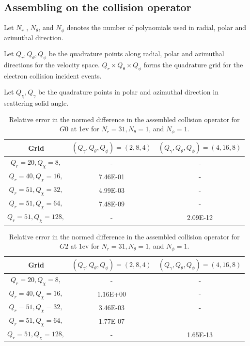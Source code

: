 \documentclass{article}
\begin{document}
\subsection{Assembling on the collision operator}
Let $N_r$ , $N_\theta$, and $N_\phi$ denotes the number of polynomials used in radial, polar and azimuthal direction. 

Let $Q_{r}, Q_{\theta}, Q_{\phi}$ be the quadrature points along radial, polar and azimuthal directions for the velocity space. $Q_{r} \times Q_{\theta} \times Q_{\phi}$ forms the quadrature grid for the electron collision incident events. 

Let $Q_{\chi},Q_{\gamma}$ be the quadrature points in polar and azimuthal direction in scattering solid angle. 

\begin{table}[H]
	\centering
	\begin{tabular}{|c|c|c|}
		\hline
		Grid & $(Q_\gamma,Q_\theta,Q_\phi)=(2,8,4)$ & $(Q_\gamma,Q_\theta,Q_\phi)=(4,16,8)$ \\
		\hline
		$Q_r=20,Q_\chi=8,$ & - & - \\
		$Q_r=40,Q_\chi=16,$ & 7.46E-01 & - \\
		$Q_r=51,Q_\chi=32,$ & 4.99E-03 & - \\
		$Q_r=51,Q_\chi=64,$ & 7.48E-09 & - \\
		$Q_r=51,Q_\chi=128,$ & - & 2.09E-12 \\
		\hline
	\end{tabular}
	\caption{Relative error in the normed difference in the assembled collision operator for $G0$ at 1ev for $N_r=31,N_\theta=1$, and $N_\phi=1$.}
\end{table}

\begin{table}[H]
	\centering
	\begin{tabular}{|c|c|c|}
		\hline
		Grid & $(Q_\gamma,Q_\theta,Q_\phi)=(2,8,4)$ & $(Q_\gamma,Q_\theta,Q_\phi)=(4,16,8)$ \\
		\hline
		$Q_r=20,Q_\chi=8,$ & - & - \\
		$Q_r=40,Q_\chi=16,$ & 1.16E+00 & - \\
		$Q_r=51,Q_\chi=32,$ & 3.46E-03 & - \\
		$Q_r=51,Q_\chi=64,$ & 1.77E-07 & - \\
		$Q_r=51,Q_\chi=128,$ & - & 1.65E-13 \\
		\hline
	\end{tabular}
	\caption{Relative error in the normed difference in the assembled collision operator for $G2$ at 1ev for $N_r=31,N_\theta=1$, and $N_\phi=1$.}
\end{table}
\end{document}
